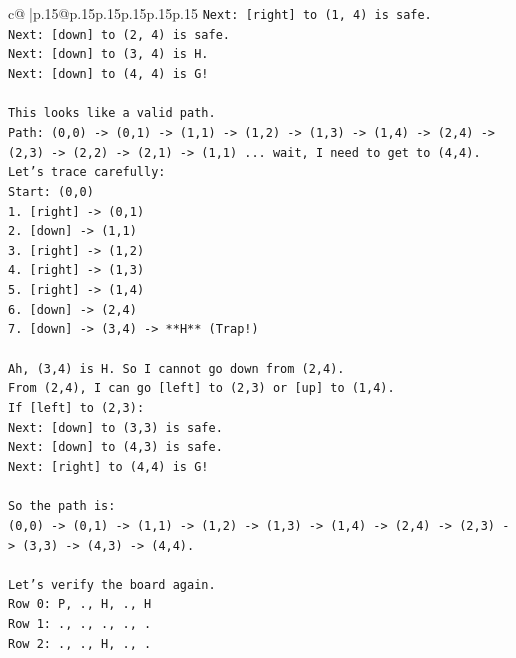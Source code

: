 \documentclass{article}
\begin{document}
{\begin{supertabular}{c@{$\;$}|p{.15\linewidth}@{}p{.15\linewidth}p{.15\linewidth}p{.15\linewidth}p{.15\linewidth}p{.15\linewidth}}
{{{\texttt{Next: {[}right{]} to (1, 4) is safe.} \\
\texttt{Next: {[}down{]} to (2, 4) is safe.} \\
\texttt{Next: {[}down{]} to (3, 4) is H.} \\
\texttt{Next: {[}down{]} to (4, 4) is G!} \\
\\ 
\texttt{This looks like a valid path.} \\
\texttt{Path: (0,0) {-}> (0,1) {-}> (1,1) {-}> (1,2) {-}> (1,3) {-}> (1,4) {-}> (2,4) {-}> (2,3) {-}> (2,2) {-}> (2,1) {-}> (1,1) ... wait, I need to get to (4,4).} \\
\texttt{Let's trace carefully:} \\
\texttt{Start: (0,0)} \\
\texttt{1. {[}right{]} {-}> (0,1)} \\
\texttt{2. {[}down{]} {-}> (1,1)} \\
\texttt{3. {[}right{]} {-}> (1,2)} \\
\texttt{4. {[}right{]} {-}> (1,3)} \\
\texttt{5. {[}right{]} {-}> (1,4)} \\
\texttt{6. {[}down{]} {-}> (2,4)} \\
\texttt{7. {[}down{]} {-}> (3,4) {-}> **H** (Trap!)} \\
\\ 
\texttt{Ah, (3,4) is H. So I cannot go down from (2,4).} \\
\texttt{From (2,4), I can go {[}left{]} to (2,3) or {[}up{]} to (1,4).} \\
\texttt{If {[}left{]} to (2,3):} \\
\texttt{Next: {[}down{]} to (3,3) is safe.} \\
\texttt{Next: {[}down{]} to (4,3) is safe.} \\
\texttt{Next: {[}right{]} to (4,4) is G!} \\
\\ 
\texttt{So the path is:} \\
\texttt{(0,0) {-}> (0,1) {-}> (1,1) {-}> (1,2) {-}> (1,3) {-}> (1,4) {-}> (2,4) {-}> (2,3) {-}> (3,3) {-}> (4,3) {-}> (4,4).} \\
\\ 
\texttt{Let's verify the board again.} \\
\texttt{Row 0: P, ., H, ., H} \\
\texttt{Row 1: ., ., ., ., .} \\
\texttt{Row 2: ., ., H, ., .} \\
}}}
\end{supertabular}}
\end{document}
